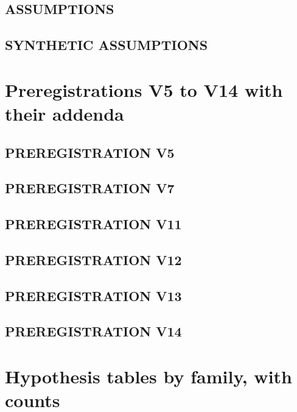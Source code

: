 \documentclass[10pt,a4paper]{article}
\begin{document}
\subsection{ASSUMPTIONS}


\subsection{SYNTHETIC ASSUMPTIONS}


\section{Preregistrations V5 to V14 with their addenda}

\subsection{PREREGISTRATION V5}


\subsection{PREREGISTRATION V7}


\subsection{PREREGISTRATION V11}


\subsection{PREREGISTRATION V12}


\subsection{PREREGISTRATION V13}


\subsection{PREREGISTRATION V14}


\section{Hypothesis tables by family, with counts}
\end{document}

